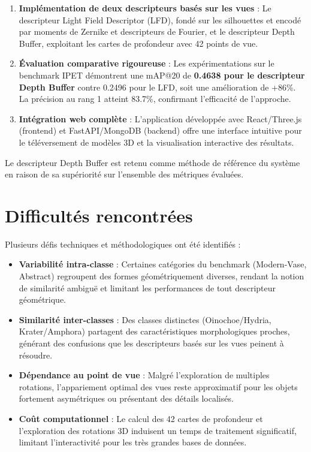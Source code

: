 \documentclass[11pt,a4paper,oneside]{report}
\begin{document}
\begin{enumerate}
\item \textbf{Implémentation de deux descripteurs basés sur les vues} : Le descripteur Light Field Descriptor (LFD), fondé sur les silhouettes et encodé par moments de Zernike et descripteurs de Fourier, et le descripteur Depth Buffer, exploitant les cartes de profondeur avec 42 points de vue.

\item \textbf{Évaluation comparative rigoureuse} : Les expérimentations sur le benchmark IPET démontrent une mAP@20 de \textbf{0.4638 pour le descripteur Depth Buffer} contre 0.2496 pour le LFD, soit une amélioration de +86\%. La précision au rang 1 atteint 83.7\%, confirmant l'efficacité de l'approche.

\item \textbf{Intégration web complète} : L'application développée avec React/Three.js (frontend) et FastAPI/MongoDB (backend) offre une interface intuitive pour le téléversement de modèles 3D et la visualisation interactive des résultats.
\end{enumerate}

Le descripteur Depth Buffer est retenu comme méthode de référence du système en raison de sa supériorité sur l'ensemble des métriques évaluées.

\section{Difficultés rencontrées}

Plusieurs défis techniques et méthodologiques ont été identifiés :

\begin{itemize}
\item \textbf{Variabilité intra-classe} : Certaines catégories du benchmark (Modern-Vase, Abstract) regroupent des formes géométriquement diverses, rendant la notion de similarité ambiguë et limitant les performances de tout descripteur géométrique.

\item \textbf{Similarité inter-classes} : Des classes distinctes (Oinochoe/Hydria, Krater/Amphora) partagent des caractéristiques morphologiques proches, générant des confusions que les descripteurs basés sur les vues peinent à résoudre.

\item \textbf{Dépendance au point de vue} : Malgré l'exploration de multiples rotations, l'appariement optimal des vues reste approximatif pour les objets fortement asymétriques ou présentant des détails localisés.

\item \textbf{Coût computationnel} : Le calcul des 42 cartes de profondeur et l'exploration des rotations 3D induisent un temps de traitement significatif, limitant l'interactivité pour les très grandes bases de données.
\end{itemize}
\end{document}
